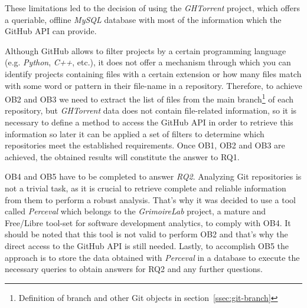 \documentclass[a4paper, 12pt]{book}
\begin{document}
These limitations led to the decision of using the \emph{GHTorrent} project, which offers a queriable, offline \emph{MySQL}
database with most of the information which the GitHub API can provide.\par
Although GitHub allows to filter projects by a certain programming language (e.g. \emph{Python}, \emph{C++}, etc.),
it does not offer a mechanism through which you can identify projects containing files with a certain extension or how many files
match with some word or pattern in their file-name in a repository. Therefore, to achieve OB2 and OB3 we need to extract the list of files
from the main branch\footnote{Definition of branch and other Git objects in section~\ref{ssec:git-branch}} of each repository,
but \emph{GHTorrent} data does not contain file-related information, so it is necessary to define a method to access the GitHub API
in order to retrieve this information so later it can be applied a set of filters to determine which repositories meet the established
requirements. Once OB1, OB2 and OB3 are achieved, the obtained results will constitute the answer to RQ1.\par
OB4 and OB5 have to be completed to answer \emph{RQ2}. Analyzing Git repositories is not a trivial task, as it is crucial
to retrieve complete and reliable information from them to perform a robust analysis. That's why it was decided to
use a tool called \emph{Perceval} which belongs to the \emph{GrimoireLab} project, a mature and Free/Libre tool-set for software development
analytics, to comply with OB4. It should be noted that this tool is not valid to perform OB2 and that's why the direct access to the
GitHub API is still needed. Lastly, to accomplish OB5 the approach is to store the data obtained with \emph{Perceval} in a database to execute
the necessary queries to obtain answers for RQ2 and any further questions.
\cleardoublepage
\end{document}
